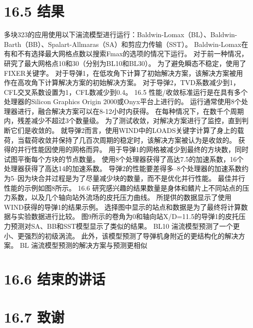\documentclass[UTF8,11pt,a4paper,openany,fontset=fandol]{ctexbook}
\begin{document}
\section{16.5 结果}
多块323的应用使用以下湍流模型进行运行：Baldwin-Lomax（BL）、Baldwin-Barth（BB）、Spalart-Allmaras（SA）和剪应力传输（SST）。 Baldwin-Lomax在有和不有选择最大网格点数以搜索Fmax的选项的情况下运行。 对于前一种情况，研究了最大网格点10和30（分别为BL10和BL30）。 为了避免瞬态不稳定，使用了FIXER关键字。 对于导弹1，在低攻角下计算了初始解决方案，该解决方案被用作在高攻角下计算解决方案的初始解决方案。 对于导弹2，TVD系数减少到1，CFL交叉系数设置为1，CFL数减少到0.4。 16.5 性能/收敛标准运行是在具有多个处理器的Silicon Graphics Origin 2000或Onyx平台上进行的。 运行通常使用8个处理器进行，融合解决方案可以在8-12小时内获得。 在每种情况下，在数千个周期内，残差减少不超过3个数量级。 为了测试收敛，对解决方案进行了监控，直到判断它们是收敛的。 就导弹2而言，使用WIND中的LOADS关键字计算了身上的载荷，当载荷收敛并保持了几百次周期的稳定时，该解决方案被认为是收敛的。 获得的并行性能因使用的网格而异。 用于导弹1的网格被减少到最终的方块数，同时试图平衡每个方块的节点数量。 使用8个处理器获得了高达7.5的加速系数，16个处理器获得了高达14的加速系数。 导弹2的性能要差得多--8个处理器的加速系数约为5--因为块合并过程是为了尽量减少块的数量，而不是优化并行性能。 最佳并行性能的示例如图8所示。 16.6 研究感兴趣的结果数量是身体和鳍片上不同站点的压力系数，以及几个轴向站外流场的皮托压力曲线。 所提供的数据显示了使用WIND获得的导弹1的结果示例。 选择图中显示的站点和数据是为了最终将计算数据与实验数据进行比较。 图9所示的卷角为0和轴向站X/D=11.5的导弹1的皮托压力预测对SA、BB和SST模型显示了类似的结果。 BL10 湍流模型预测了一个更小、更强烈的初级涡流。 此外，该模型预测了导弹机身附近的更结构化的解决方案。 BL 湍流模型预测的解决方案与预测更相似

\section{16.6 结束的讲话}
\section{16.7 致谢}
\end{document}
